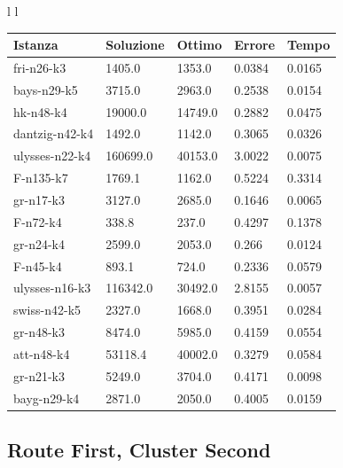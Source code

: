 \documentclass[]{article}
\begin{document}
\begin{tabular}{l l}
	\small		
	\begin{tabular}{||l | l l l l||} 
		\hline
		Istanza & Soluzione & Ottimo & Errore & Tempo \\ [0.5ex] 
		\hline\hline
		fri-n26-k3 & 1405.0 & 1353.0 & 0.0384 & 0.0165  \\
		bays-n29-k5 & 3715.0 & 2963.0 & 0.2538 & 0.0154  \\
		hk-n48-k4 & 19000.0 & 14749.0 & 0.2882 & 0.0475  \\
		dantzig-n42-k4 & 1492.0 & 1142.0 & 0.3065 & 0.0326  \\
		ulysses-n22-k4 & 160699.0 & 40153.0 & 3.0022 & 0.0075  \\
		F-n135-k7 & 1769.1 & 1162.0 & 0.5224 & 0.3314  \\
		gr-n17-k3 & 3127.0 & 2685.0 & 0.1646 & 0.0065  \\
		F-n72-k4 & 338.8 & 237.0 & 0.4297 & 0.1378  \\
		gr-n24-k4 & 2599.0 & 2053.0 & 0.266 & 0.0124  \\
		F-n45-k4 & 893.1 & 724.0 & 0.2336 & 0.0579  \\
		ulysses-n16-k3 & 116342.0 & 30492.0 & 2.8155 & 0.0057  \\
		swiss-n42-k5 & 2327.0 & 1668.0 & 0.3951 & 0.0284  \\
		gr-n48-k3 & 8474.0 & 5985.0 & 0.4159 & 0.0554  \\
		att-n48-k4 & 53118.4 & 40002.0 & 0.3279 & 0.0584  \\
		gr-n21-k3 & 5249.0 & 3704.0 & 0.4171 & 0.0098  \\
		bayg-n29-k4 & 2871.0 & 2050.0 & 0.4005 & 0.0159  \\		
		[1ex] 
		\hline
	\end{tabular}
	
\end{tabular}




\subsection{Route First, Cluster Second}
\end{document}
